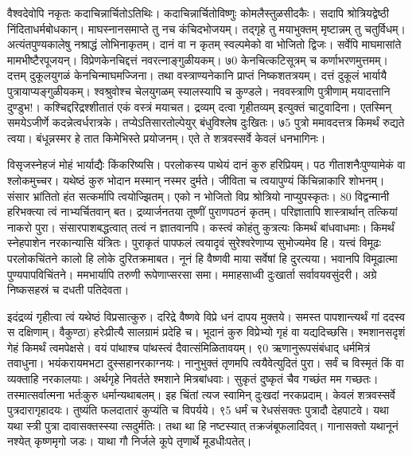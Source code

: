 वैश्वदेवोपि नकृतः कदाचिन्नार्चितोऽतिथिः।
 कदाचिन्नार्चितोविष्णुः कोमलैस्तुळसीदकैः।
 सदापि श्रोत्रियद्वेष्ठी निंदिताधर्मबोधकान्।
 माघस्नानसमाप्ते तु नच कंचिदभोजयम्।
 तद्गृहे तु मयाभुक्तम् मृष्टान्नम् तु चतुर्विधम्।
 अत्यंतपुण्यकालेषु नश्राद्धं लोभिनाकृतम्।
 दानं वा न कृतम् स्वल्पमेको वा भोजितो द्विजः।
 सर्वेपि माघमासांते मामभीष्टैरपूजयन्।
 विप्रेणकेनचिद्दत्तं नवरत्नाङ्गुळीयकम्।
 ७0 केनचित्कटिसूत्रम् च कर्णाभरणमुत्तमम्।
 दत्तम् दुकूलयुगळं केनचिन्माघमज्जिना।
 तथा वस्त्राण्यनेकानि प्राप्तं निष्कशतत्रयम्।
 दत्तं दुकूलं भार्यायै पुत्रायाप्यङ्गुळीयकम्।
 श्वश्रुवोश्च चेलयुगळम् स्यालस्यापि च कुण्डले।
 नववस्त्राणि पुत्रीणाम् मयादत्तानि दुण्डुभ!।
 कश्चिद्दरिद्रश्शीतातं एकं वस्त्रं मयाचत।
 द्रव्यम् दत्वा गृहीतव्यम् इत्युक्तं चाटुवादिना।
 एतस्मिन् समयेऽजीर्णे कदन्नेत्वर्धरात्रके।
 तप्येऽतिसारतोल्पेयुर् बंधुविश्लेष दुःखितः।
 ७5 पुत्रो ममावदत्तत्र किमर्थं रुद्यते त्वया।
 बंधून्नस्मर हे तात किमेभिस्ते प्रयोजनम्।
 एते ते शत्रवस्सर्वे केवलं धनभागिनः।
 
विसृजस्नेहजं मोहं भार्याद्यैः किंकरिष्यसि।
 परलोकस्य पाथेयं दानं कुरु हरिप्रियम्।
 पठ गीताशनैःपुण्यामेकं वा श्लोकमुच्चर।
 यथेष्ठं कुरु भोदान मस्मान् नस्मर दुर्मते।
 जीविता च त्वयापुण्यं किंचिन्नाकारि शोभनम्।
 संसार भ्रांतितो हंत सत्कर्मापि त्वयोज्झितम्।
 एको न भोजितो विप्र श्रोत्रियो नाप्युपस्कृतः।
 80 विद्वन्मानी हरिभक्त्या त्वं नाभ्यर्चितवान् बत।
 द्रव्यार्जनतया तूष्णीं पुराणपठनं कृतम्।
 परिज्ञातापि शास्त्रार्थान् तत्कियां नाकरो पुरा।
 संसारपाशबद्धत्वात् तत्वं न ज्ञातवानपि।
 कस्त्वं कोहंतु कुत्रत्यः किमर्थं बांधवाधमाः।
 किमर्थं स्नेहपाशेन नरकान्यासि यंत्रितः।
 पुराकृतं पापफलं त्वयादृवं सुरेश्वरेणाप्य
सुभोज्यमेव हि।
 यत्त्वं विमूढः परलोकचिंतने कालो
हि लोके दुरितक्रमाबत।
 नूनं हि वैष्णवी माया सर्वेषां हि दुरत्यया।
 भवानपि विमूढात्मा पुण्यपापविचिंतने।
 ममभार्यापि तरुणी रूपेणाप्सरसा समा।
 ममाहसाध्वी दुःखार्ता सर्वावयवसुंदरी।
 अग्रे निष्कसहस्रं च दधती पतिदेवता।
 
इदंद्रव्यं गृहीत्वा त्वं यथेष्ठं विप्रसात्कुरु।
 दरिद्रे वैष्णवे विप्रे धनं दापय मुक्तये।
 समस्त पापशान्त्यर्थं गां ददस्व स दक्षिणाम्।
 वैकुण्ठा) हरेःप्रीत्यै सालग्रामं प्रदेहि च।
 भूदानं कुरु विप्रेभ्यो गृहं वा यद्यदिच्छसि।
 श्मशानसदृशं गेहं किमर्थं त्वमपेक्षसे।
 वयं पांथाश्च पांथस्त्वं दैवात्संमिळितावयम्।
 ९0 ऋणानुरूपसंबंधाद् धर्ममित्रं तवाधुना।
 भयंकरायमभटा दुस्सहानरकाग्नयः।
 नानुभुक्तं तृणमपि त्वयैवेत्युदितं पुरा।
 सर्वं च विस्मृतं किं वा व्यक्ताहि नरकालयाः।
 अर्थगृहे निवर्तते श्मशाने मित्रबांधवाः।
 सुकृतं दुष्कृतं चैव गच्छंत मम गच्छतः।
 तस्मात्सर्वात्मना भर्तःकुरु धर्मान्यथाबलम्।
 इह चिंतां त्यज स्वामिन् दुःखदां नरकप्रदाम्।
 केवलं शत्रवस्सर्वे पुत्रदारागृहादयः।
 तुष्यंति फलदातारं कुप्यंति च विपर्यये।
 ९5 धर्मं च रेधसंसक्तः पुत्रादौ देहपाटवे।
 यथा यथा स्त्री पुत्रा दावासक्तस्स्या त्सदुर्मतिः।
 तथा था हि नष्टस्यात् तक्रजंबूफलादिवत्।
 गानासक्तो यथानूनं नश्येत् कृष्णमृगो जडः।
 याथा गौ निर्जले कूपे तृणार्थे मूडधीःपतेत्।
 
